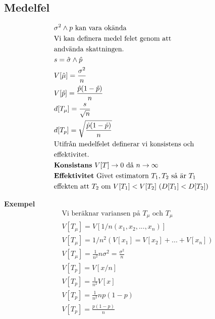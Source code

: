 \begin{multicols}{2}
\subsection{Medelfel}
\begin{align*}
  &\sigma^2 \land p \text{ kan vara okända}\\
  &\text{Vi kan definera medel felet genom att} \\
  &\text{andvända skattningen.} \\
  &s=\hat{\sigma} \land \hat{p} \\
  &V[\hat{\mu}]=\frac{\sigma^2}{n}  \\
  &V[\hat{p}]  =  \frac{\hat{p}(1-\hat{p})}{n} \\
  &d[T_{\mu}]   = \frac{s}{\sqrt{n}} \\
  &d[T_{p}]     = \sqrt{\frac{\hat{p}(1-\hat{p})}{n}} \\
  &\text{Utifrån medelfelet definerar vi konsistens och} \\
  &\text{effektivitet.} \\
  &\text{\textbf{Konsistans} $V[T]\to0$ då $n\to\infty$} \\
  &\text{\textbf{Effektivitet} Givet estimatorn $T_1,T_2$ så är $T_1$} \\
  &\text{effekten att $T_2$ om $V[T_1]<V[T_2]$ ($D[T_1]<D[T_2]$)} \\
\end{align*}

\textbf{Exempel}
\begin{align*}
  &\quad  \text{Vi beräknar variansen på $T_{\mu}$ och $T_{\mu}$}  \\
  &\quad  V[T_{\mu}] = V[1/n(x_1,x_2,...,x_n)] \\
  &\quad  V[T_{\mu}] = 1/n^2(V[x_1] = V[x_2] + ... +V[x_n]) \\
  &\quad  V[T_{\mu}] = \frac{1}{n^2} n\sigma^2 = \frac{\sigma^2}{n} \\
  &\quad  V[T_{p}] = V[x/n] \\
  &\quad  V[T_{p}] = \frac{1}{n^2}V[x] \\
  &\quad  V[T_{p}] = \frac{1}{n^2} np(1-p) \\
  &\quad  V[T_{p}] = \frac{p(1-p)}{n} \\
\end{align*}


\end{multicols}
